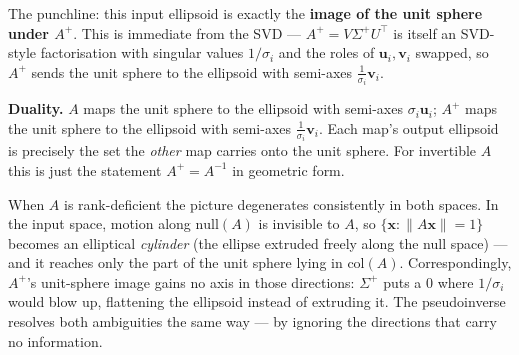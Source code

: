 \documentclass[12pt, a4paper]{article}
\theoremstyle{definition}
\begin{document}
\begin{center}
\end{center}

The punchline: this input ellipsoid is exactly the \textbf{image of the unit sphere under $A^+$}. This is immediate from the SVD — $A^+ = V\Sigma^+U^\top$ is itself an SVD-style factorisation with singular values $1/\sigma_i$ and the roles of $\mathbf{u}_i, \mathbf{v}_i$ swapped, so $A^+$ sends the unit sphere to the ellipsoid with semi-axes $\tfrac{1}{\sigma_i}\mathbf{v}_i$.

\begin{keybox}
\textbf{Duality.} $A$ maps the unit sphere to the ellipsoid with semi-axes $\sigma_i\mathbf{u}_i$; $A^+$ maps the unit sphere to the ellipsoid with semi-axes $\tfrac{1}{\sigma_i}\mathbf{v}_i$. Each map's output ellipsoid is precisely the set the \emph{other} map carries onto the unit sphere. For invertible $A$ this is just the statement $A^+ = A^{-1}$ in geometric form.
\end{keybox}

When $A$ is rank-deficient the picture degenerates consistently in both spaces. In the input space, motion along $\text{null}(A)$ is invisible to $A$, so $\{\mathbf{x} : \|A\mathbf{x}\| = 1\}$ becomes an elliptical \emph{cylinder} (the ellipse extruded freely along the null space) — and it reaches only the part of the unit sphere lying in $\text{col}(A)$. Correspondingly, $A^+$'s unit-sphere image gains no axis in those directions: $\Sigma^+$ puts a $0$ where $1/\sigma_i$ would blow up, flattening the ellipsoid instead of extruding it. The pseudoinverse resolves both ambiguities the same way — by ignoring the directions that carry no information.
\end{document}

